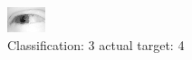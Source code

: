 \begin{figure}[h!]
\begin{center}
\includegraphics[width=0.60\columnwidth]{figures/ID2428_class_3_target_4.png}
\end{center}
\caption{ Classification: 3 actual target: 4}
\label{fig:ID2428_class_3_target_4}
\end{figure}
